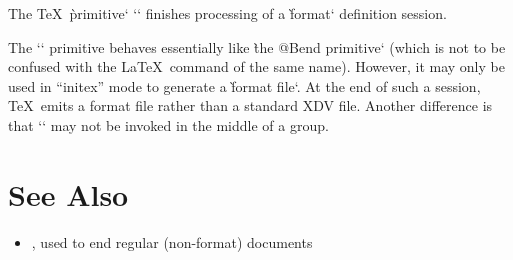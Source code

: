 
The \TeX\ \`primitive` \tex`\dump` finishes processing of a \`format` definition
session.

The \tex`\dump` primitive behaves essentially like \`the @Bend primitive` (which
is not to be confused with the \LaTeX\ command of the same name). However, it
may only be used in “initex” mode to generate a \`format file`. At the end of
such a session, \TeX\ emits a format file rather than a standard XDV file.
Another difference is that \tex`\dump` may not be invoked in the middle of a
group.

\section*{See Also}

\begin{itemize}
\item {}, used to end regular (non-format) documents
\end{itemize}
